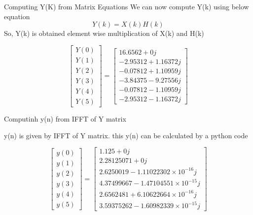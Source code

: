 \documentclass{beamer}
\begin{document}
\begin{frame}{Computing Y(K) from Matrix Equations}
We can now compute Y(k) using below equation
   \[ Y(k) = X(k)H(k)\]
So, Y(k) is obtained element wise multiplication of X(k) and H(k)

 \[
\begin{bmatrix} 
Y(0) \\ Y(1) \\ Y(2) \\ Y(3) \\ Y(4) \\ Y(5) 
\end{bmatrix}
=
\begin{bmatrix}
16.6562+0j \\ -2.95312+1.16372j \\ -0.07812+1.10959j \\ -3.84375-9.27556j \\ -0.07812-1.10959j \\ -2.95312-1.16372j 
\end{bmatrix}\]


\end{frame}
\begin{frame}{Computinh y(n) from IFFT of Y matrix}
   
y(n) is given by IFFT of Y matrix. this y(n) can be calculated by a python code 

\[
    \begin{bmatrix} 
y(0) \\ y(1) \\ y(2) \\ y(3) \\ y(4) \\ y(5) 
\end{bmatrix}
=
\begin{bmatrix}
1.125     +0j \\ 2.28125071+0j \\ 2.6250019 -1.11022302 \times 10^{-16}j \\ 4.37499667-1.47104551\times 10^{-15}j \\ 2.6562481 +6.10622664 \times 10^{-16}j \\ 3.59375262-1.60982339 \times 10^{-15}j 
\end{bmatrix}
\]
\end{frame}
\end{document}
